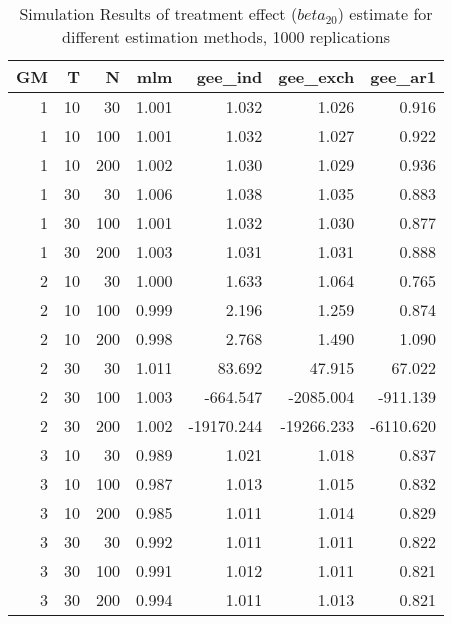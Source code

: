 \begin{table}[ht]
\centering
\begin{tabular}{rrrrrrr}
  \hline
GM & T & N & mlm & gee\_ind & gee\_exch & gee\_ar1 \\ 
  \hline
1 & 10 & 30 & 1.001 & 1.032 & 1.026 & 0.916 \\ 
  1 & 10 & 100 & 1.001 & 1.032 & 1.027 & 0.922 \\ 
  1 & 10 & 200 & 1.002 & 1.030 & 1.029 & 0.936 \\ 
  1 & 30 & 30 & 1.006 & 1.038 & 1.035 & 0.883 \\ 
  1 & 30 & 100 & 1.001 & 1.032 & 1.030 & 0.877 \\ 
  1 & 30 & 200 & 1.003 & 1.031 & 1.031 & 0.888 \\ 
   \hline
2 & 10 & 30 & 1.000 & 1.633 & 1.064 & 0.765 \\ 
  2 & 10 & 100 & 0.999 & 2.196 & 1.259 & 0.874 \\ 
  2 & 10 & 200 & 0.998 & 2.768 & 1.490 & 1.090 \\ 
  2 & 30 & 30 & 1.011 & 83.692 & 47.915 & 67.022 \\ 
  2 & 30 & 100 & 1.003 & -664.547 & -2085.004 & -911.139 \\ 
  2 & 30 & 200 & 1.002 & -19170.244 & -19266.233 & -6110.620 \\ 
   \hline
3 & 10 & 30 & 0.989 & 1.021 & 1.018 & 0.837 \\ 
  3 & 10 & 100 & 0.987 & 1.013 & 1.015 & 0.832 \\ 
  3 & 10 & 200 & 0.985 & 1.011 & 1.014 & 0.829 \\ 
  3 & 30 & 30 & 0.992 & 1.011 & 1.011 & 0.822 \\ 
  3 & 30 & 100 & 0.991 & 1.012 & 1.011 & 0.821 \\ 
  3 & 30 & 200 & 0.994 & 1.011 & 1.013 & 0.821 \\ 
   \hline
\end{tabular}
\caption{Simulation Results of treatment effect ($beta_{20}$) estimate for different estimation methods, 1000 replications} 
\label{tab:sim_results}
\end{table}
